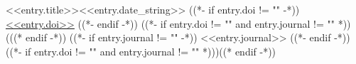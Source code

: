 \resumeSubheading
    {<<entry.title>>}{<<entry.date_string>>}
    {
((*- if entry.doi != "" -*))
\href{<<entry.doi_url>>}{<<entry.doi>>}
((*- endif -*))
((*- if entry.doi != "" and entry.journal != "" *)) (((* endif -*))
((*- if entry.journal != "" -*))
<<entry.journal>>
((*- endif -*))
((*- if entry.doi != "" and entry.journal != "" *)))((* endif -*))
}{}
    \resumeItemListStart
    \resumeItemListEnd